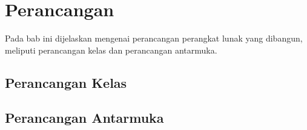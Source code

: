 \chapter{Perancangan}
\label{chap:Perancangan}

Pada bab ini dijelaskan mengenai perancangan perangkat lunak yang dibangun, meliputi perancangan kelas dan perancangan antarmuka.

\section{Perancangan Kelas}
\label{sec:perancangan_kelas}

\section{Perancangan Antarmuka}
\label{sec:perancangan_antarmuka}